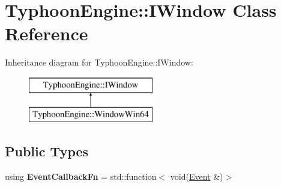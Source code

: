 \hypertarget{class_typhoon_engine_1_1_i_window}{}\section{Typhoon\+Engine\+::I\+Window Class Reference}
\label{class_typhoon_engine_1_1_i_window}
Inheritance diagram for Typhoon\+Engine\+::I\+Window\+:\begin{figure}[H]
\begin{center}
\leavevmode
\includegraphics[height=2.000000cm]{class_typhoon_engine_1_1_i_window}
\end{center}
\end{figure}
\subsection*{Public Types}
\begin{DoxyCompactItemize}
\item 
\mbox{\label{class_typhoon_engine_1_1_i_window_aae79b166d4c70ce0990f9e10b2cdff3f}} 
using {\bfseries Event\+Callback\+Fn} = std\+::function$<$ void(\mbox{\hyperlink{class_typhoon_engine_1_1_event}{Event}} \&)$>$
\end{DoxyCompactItemize}

